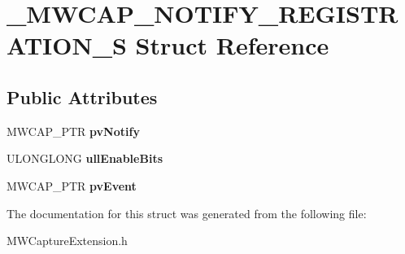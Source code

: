 \hypertarget{struct__MWCAP__NOTIFY__REGISTRATION__S}{\section{\-\_\-\-M\-W\-C\-A\-P\-\_\-\-N\-O\-T\-I\-F\-Y\-\_\-\-R\-E\-G\-I\-S\-T\-R\-A\-T\-I\-O\-N\-\_\-\-S Struct Reference}
\label{struct__MWCAP__NOTIFY__REGISTRATION__S}
}
\subsection*{Public Attributes}
\begin{DoxyCompactItemize}
\item 
\hypertarget{struct__MWCAP__NOTIFY__REGISTRATION__S_a67c8aec43a26053bec6d1c22b46c5f80}{M\-W\-C\-A\-P\-\_\-\-P\-T\-R {\bfseries pv\-Notify}}\label{struct__MWCAP__NOTIFY__REGISTRATION__S_a67c8aec43a26053bec6d1c22b46c5f80}

\item 
\hypertarget{struct__MWCAP__NOTIFY__REGISTRATION__S_a48762dfb6f0c35e502afe2454c38f692}{U\-L\-O\-N\-G\-L\-O\-N\-G {\bfseries ull\-Enable\-Bits}}\label{struct__MWCAP__NOTIFY__REGISTRATION__S_a48762dfb6f0c35e502afe2454c38f692}

\item 
\hypertarget{struct__MWCAP__NOTIFY__REGISTRATION__S_af17e58573803ea063f70de46f5408a9a}{M\-W\-C\-A\-P\-\_\-\-P\-T\-R {\bfseries pv\-Event}}\label{struct__MWCAP__NOTIFY__REGISTRATION__S_af17e58573803ea063f70de46f5408a9a}

\end{DoxyCompactItemize}


The documentation for this struct was generated from the following file\-:\begin{DoxyCompactItemize}
\item 
M\-W\-Capture\-Extension.\-h\end{DoxyCompactItemize}
